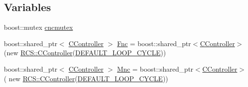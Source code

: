 \subsection*{Variables}
\begin{DoxyCompactItemize}
\item 
boost\-::mutex \hyperlink{namespaceRCS_a021572a9d03c82d96029e82ea5691d60}{cncmutex}
\item 
boost\-::shared\-\_\-ptr$<$ \hyperlink{structRCS_1_1CController}{C\-Controller} $>$ \hyperlink{namespaceRCS_a7e9552ea392162dd1bb9dcc89e6184fb}{Fnc} = boost\-::shared\-\_\-ptr$<$\hyperlink{structRCS_1_1CController}{C\-Controller}$>$(new \hyperlink{structRCS_1_1CController}{R\-C\-S\-::\-C\-Controller}(\hyperlink{RCS_8h_a226eb3a426e9df46b88c4ba34f217203}{D\-E\-F\-A\-U\-L\-T\-\_\-\-L\-O\-O\-P\-\_\-\-C\-Y\-C\-L\-E}))
\item 
boost\-::shared\-\_\-ptr$<$ \hyperlink{structRCS_1_1CController}{C\-Controller} $>$ \hyperlink{namespaceRCS_a7743d3581146fcdb467ee8cedaa5ebef}{Mnc} = boost\-::shared\-\_\-ptr$<$\hyperlink{structRCS_1_1CController}{C\-Controller}$>$( new \hyperlink{structRCS_1_1CController}{R\-C\-S\-::\-C\-Controller}(\hyperlink{RCS_8h_a226eb3a426e9df46b88c4ba34f217203}{D\-E\-F\-A\-U\-L\-T\-\_\-\-L\-O\-O\-P\-\_\-\-C\-Y\-C\-L\-E}))
\end{DoxyCompactItemize}


